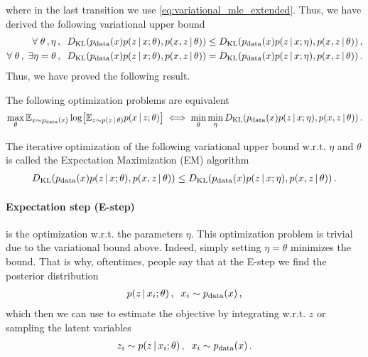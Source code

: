 where in the last transition we use \cref{eq:variational_mle_extended}.
Thus, we have derived the following variational upper bound
\begin{align}
\begin{split}
    \forall\; \theta\,,\eta\,,\;\;D_{\mathrm{KL}}(p_{\text{data}}(x)p(z\,|\, x;\theta), p(x,z\,|\, \theta)) \leq D_{\mathrm{KL}}(p_{\text{data}}(x)p(z\,|\, x;\eta), p(x,z\,|\, \theta))\,,\\
    \forall\; \theta\,,\;\exists \eta = \theta \,,\;\;D_{\mathrm{KL}}(p_{\text{data}}(x)p(z\,|\, x;\theta), p(x,z\,|\, \theta)) = D_{\mathrm{KL}}(p_{\text{data}}(x)p(z\,|\, x;\eta), p(x,z\,|\, \theta))\,.
    \label{eq:em_variational_bound}
\end{split}
\end{align}
Thus, we have proved the following result.
\begin{proposition}
The following optimization problems are equivalent
    \begin{align}
        \max_\theta \mean_{x\sim p_{\text{data}}(x)}\log \left[\mean_{z \sim p(z\cond\theta)}p(x\cond z;\theta)\right] \iff \min_\theta \min_\eta\KL(p_{\text{data}}(x)p(z\cond x;\eta), p(x,z\cond \theta))\,.
    \end{align}
\end{proposition}

\begin{mybox}
\begin{definition}[EM-algorithm]\label{def:em_algo}
    The iterative optimization of the following variational upper bound w.r.t. $\eta$ and $\theta$ is called the Expectation Maximization (EM) algorithm
    \begin{align}
        D_{\mathrm{KL}}(p_{\text{data}}(x)p(z\,|\, x;\theta), p(x,z\,|\, \theta)) \leq D_{\mathrm{KL}}(p_{\text{data}}(x)p(z\,|\, x;\eta), p(x,z\,|\, \theta))\,.
    \end{align}
\end{definition}    
\end{mybox}

\paragraph{Expectation step (E-step)} is the optimization w.r.t. the parameters $\eta$. This optimization problem is trivial due to the variational bound above. Indeed, simply setting $\eta = \theta$ minimizes the bound.
That is why, oftentimes, people say that at the E-step we find the posterior distribution
\begin{align}
    p(z\,|\, x_i;\theta)\,,\;\; x_i \sim p_{\text{data}}(x)\,,
\end{align}
which then we can use to estimate the objective by integrating w.r.t. $z$ or sampling the latent variables
\begin{align}
    z_i \sim p(z\,|\, x_i;\theta)\,,\;\; x_i \sim p_{\text{data}}(x)\,.
\end{align}

